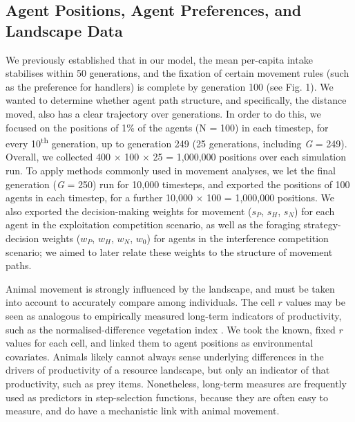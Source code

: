 \subsection*{Agent Positions, Agent Preferences, and Landscape Data}

We previously established that in our model, the mean per-capita intake stabilises within 50 generations, and the fixation of certain movement rules (such as the preference for handlers) is complete by generation 100 (see Fig. 1).
We wanted to determine whether agent path structure, and specifically, the distance moved, also has a clear trajectory over generations.
In order to do this, we focused on the positions of 1\% of the agents (N = 100) in each timestep, for every 10\textsuperscript{th} generation, up to generation 249 (25 generations, including \textit{G} = 249).
Overall, we collected 400 $\times$ 100 $\times$ 25 = 1,000,000 positions over each simulation run.
To apply methods commonly used in movement analyses, we let the final generation (\textit{G} = 250) run for 10,000 timesteps, and exported the positions of 100 agents in each timestep, for a further 10,000 $\times$ 100 = 1,000,000 positions.
We also exported the decision-making weights for movement ($s_P$, $s_H$, $s_N$) for each agent in the exploitation competition scenario, as well as the foraging strategy-decision weights ($w_P$, $w_H$, $w_N$, $w_0$) for agents in the interference competition scenario; we aimed to later relate these weights to the structure of movement paths.

Animal movement is strongly influenced by the landscape, and must be taken into account to accurately compare among individuals.
The cell $r$ values may be seen as analogous to empirically measured long-term indicators of productivity, such as the normalised-difference vegetation index \citep[NDVI;][]{pettorelli2011}.
We took the known, fixed $r$ values for each cell, and linked them to agent positions as environmental covariates.
Animals likely cannot always sense underlying differences in the drivers of productivity of a resource landscape, but only an indicator of that productivity, such as prey items.
Nonetheless, long-term measures are frequently used as predictors in step-selection functions, because they are often easy to measure, and do have a mechanistic link with animal movement.

